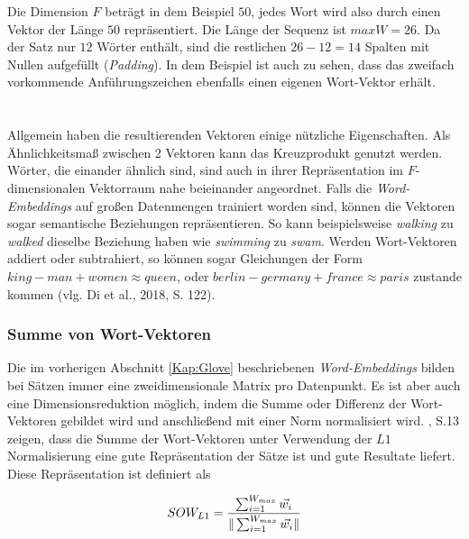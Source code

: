 \documentclass[a4paper,11pt]{article}
\begin{document}
Die Dimension $F$ beträgt in dem Beispiel $50$, jedes Wort wird also durch einen Vektor der Länge $50$ repräsentiert. Die Länge der Sequenz ist $maxW = 26$. Da der Satz nur $12$ Wörter enthält, sind die restlichen $26-12 = 14$ Spalten mit Nullen aufgefüllt (\textit{Padding}). In dem Beispiel ist auch zu sehen, dass das zweifach vorkommende Anführungszeichen  ebenfalls einen eigenen Wort-Vektor erhält.\\
\\
\\
Allgemein haben die resultierenden Vektoren einige nützliche Eigenschaften. Als Ähnlichkeits\-maß zwischen 2 Vektoren kann das Kreuzprodukt genutzt werden. Wörter, die einander ähnlich sind, sind auch in ihrer Repräsentation im $F$-dimensionalen Vektorraum nahe beieinander angeordnet. Falls die \textit{Word-Embeddings} auf großen Datenmengen trainiert worden sind, können die Vektoren sogar semantische Beziehungen repräsentieren. So kann beispielsweise \textit{walking} zu \textit{walked} dieselbe Beziehung haben wie \textit{swimming} zu \textit{swam}. Werden Wort-Vektoren addiert oder subtrahiert, so können sogar Gleichungen der Form $king - man + women \approx queen$, oder $berlin - germany + france \approx paris$ zustande kommen (vlg. Di et al., 2018, S. 122).

\subsubsection{Summe von Wort-Vektoren}

Die im vorherigen Abschnitt \ref{Kap:Glove} beschriebenen \textit{Word-Embeddings} bilden bei Sätzen immer eine zweidimensionale Matrix pro Datenpunkt. Es ist aber auch eine Dimensionsreduktion möglich, indem die Summe oder Differenz der Wort-Vektoren gebildet wird und anschließend mit einer Norm normalisiert wird. \cite{sumsWords}, S.13 zeigen, dass die Summe der Wort-Vektoren unter Verwendung der $L1$ Normalisierung eine gute Repräsentation der Sätze ist und gute Resultate liefert. Diese Repräsentation ist definiert als

\[SOW_{L1} = \frac{\sum_{i=1}^{W_{max}} \Vec{w_i}}{\| \sum_{i=1}^{W_{max}}  \vec{w_i} \|} \vspace{0.2cm}\]
\end{document}
